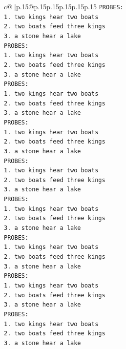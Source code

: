 \documentclass{article}
\begin{document}
{\begin{supertabular}{c@{$\;$}|p{.15\linewidth}@{}p{.15\linewidth}p{.15\linewidth}p{.15\linewidth}p{.15\linewidth}p{.15\linewidth}}
{{{\texttt{PROBES:} \\
\texttt{1. two kings hear two boats} \\
\texttt{2. two boats feed three kings} \\
\texttt{3. a stone hear a lake} \\
\texttt{PROBES:} \\
\texttt{1. two kings hear two boats} \\
\texttt{2. two boats feed three kings} \\
\texttt{3. a stone hear a lake} \\
\texttt{PROBES:} \\
\texttt{1. two kings hear two boats} \\
\texttt{2. two boats feed three kings} \\
\texttt{3. a stone hear a lake} \\
\texttt{PROBES:} \\
\texttt{1. two kings hear two boats} \\
\texttt{2. two boats feed three kings} \\
\texttt{3. a stone hear a lake} \\
\texttt{PROBES:} \\
\texttt{1. two kings hear two boats} \\
\texttt{2. two boats feed three kings} \\
\texttt{3. a stone hear a lake} \\
\texttt{PROBES:} \\
\texttt{1. two kings hear two boats} \\
\texttt{2. two boats feed three kings} \\
\texttt{3. a stone hear a lake} \\
\texttt{PROBES:} \\
\texttt{1. two kings hear two boats} \\
\texttt{2. two boats feed three kings} \\
\texttt{3. a stone hear a lake} \\
\texttt{PROBES:} \\
\texttt{1. two kings hear two boats} \\
\texttt{2. two boats feed three kings} \\
\texttt{3. a stone hear a lake} \\
\texttt{PROBES:} \\
\texttt{1. two kings hear two boats} \\
\texttt{2. two boats feed three kings} \\
\texttt{3. a stone hear a lake} \\
}}}
\end{supertabular}}
\end{document}
